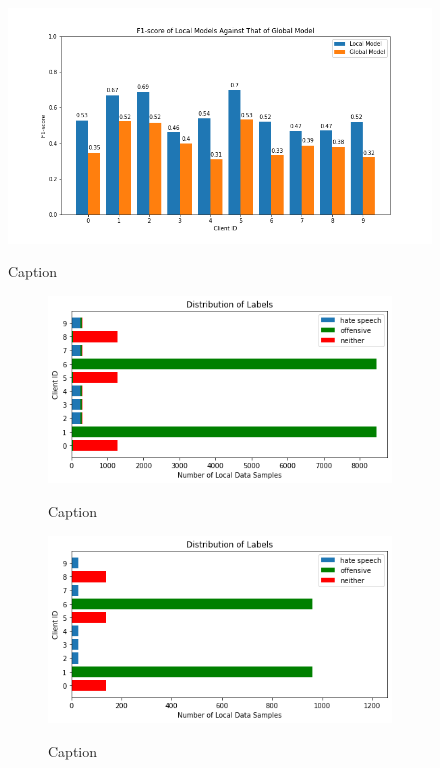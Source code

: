 \documentclass[letterpaper]{article} %
\begin{document}
\begin{figure}[hbt!]
{\includegraphics[width=\columnwidth]{noniid-quantity-based-label-imbalance-2_seed_2performance_of_local_models_f1score}}
\caption{Caption}
\end{figure}


\begin{figure}[hbt!]

\begin{subfigure}{\columnwidth}
{\includegraphics[width=\columnwidth]{noniid-quantity-based-label-imbalance-1_distribution_of_labels_5}}
\caption{Caption}
\end{subfigure}

\begin{subfigure}{\columnwidth}
{\includegraphics[width=\columnwidth]{noniid-quantity-based-label-imbalance-1_test_set_distribution_of_labels_5}}
\caption{Caption}
\end{subfigure}

\caption{}
\end{figure}
\end{document}
